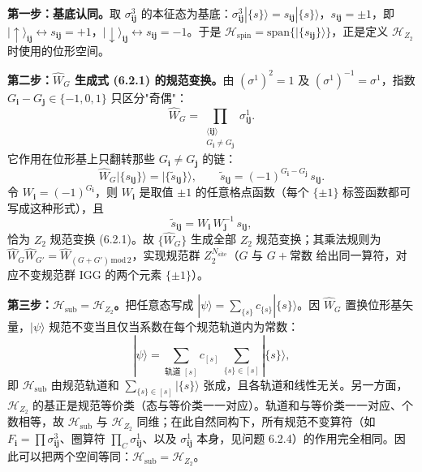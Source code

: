 \textbf{第一步：基底认同。}取 $\sigma^3_{\pmb{ij}}$ 的本征态为基底：$\sigma^3_{\pmb{ij}}|\{s\}\rangle=s_{\pmb{ij}}|\{s\}\rangle$，$s_{\pmb{ij}}=\pm1$，即 $|\uparrow\rangle_{\pmb{ij}}\leftrightarrow s_{\pmb{ij}}=+1$，$|\downarrow\rangle_{\pmb{ij}}\leftrightarrow s_{\pmb{ij}}=-1$。于是 $\mathcal{H}_{\text{spin}}=\text{span}\{|\{s_{\pmb{ij}}\}\rangle\}$，正是定义 $\mathcal{H}_{Z_2}$ 时使用的位形空间。

\textbf{第二步：$\hat W_G$ 生成式 (6.2.1) 的规范变换。}由 $(\sigma^1)^2=1$ 及 $(\sigma^1)^{-1}=\sigma^1$，指数 $G_{\pmb i}-G_{\pmb j}\in\{-1,0,1\}$ 只区分"奇偶"：
\begin{equation*}
\hat W_G=\prod_{\substack{\langle\pmb{ij}\rangle\\ G_{\pmb i}\neq G_{\pmb j}}}\sigma^1_{\pmb{ij}} .
\end{equation*}
它作用在位形基上只翻转那些 $G_{\pmb i}\neq G_{\pmb j}$ 的链：
\begin{equation*}
\hat W_G|\{s_{\pmb{ij}}\}\rangle=\bigl|\{\tilde s_{\pmb{ij}}\}\bigr\rangle,
\qquad
\tilde s_{\pmb{ij}}=(-1)^{G_{\pmb i}-G_{\pmb j}}\,s_{\pmb{ij}} .
\end{equation*}
令 $W_{\pmb i}=(-1)^{G_{\pmb i}}$，则 $W_{\pmb i}$ 是取值 $\pm1$ 的任意格点函数（每个 $\{\pm1\}$ 标签函数都可写成这种形式），且
\begin{equation*}
\tilde s_{\pmb{ij}}=W_{\pmb i}\,W_{\pmb j}^{-1}\,s_{\pmb{ij}},
\end{equation*}
恰为 $Z_2$ 规范变换 (6.2.1)。故 $\{\hat W_G\}$ 生成全部 $Z_2$ 规范变换；其乘法规则为 $\hat W_G\hat W_{G'}=\hat W_{(G+G')\,\mathrm{mod}\,2}$，实现规范群 $Z_2^{N_{\text{site}}}$（$G$ 与 $G+\text{常数}$ 给出同一算符，对应不变规范群 IGG 的两个元素 $\{\pm1\}$）。

\textbf{第三步：$\mathcal{H}_{\text{sub}}=\mathcal{H}_{Z_2}$。}把任意态写成 $|\psi\rangle=\sum_{\{s\}}c_{\{s\}}|\{s\}\rangle$。因 $\hat W_G$ 置换位形基矢量，$|\psi\rangle$ 规范不变当且仅当系数在每个规范轨道内为常数：
\begin{equation*}
|\psi\rangle=\sum_{\text{轨道 }[s]}c_{[s]}\ \sum_{\{s\}\in[s]}|\{s\}\rangle ,
\end{equation*}
即 $\mathcal{H}_{\text{sub}}$ 由规范轨道和 $\sum_{\{s\}\in[s]}|\{s\}\rangle$ 张成，且各轨道和线性无关。另一方面，$\mathcal{H}_{Z_2}$ 的基正是规范等价类（态与等价类一一对应）。轨道和与等价类一一对应、个数相等，故 $\mathcal{H}_{\text{sub}}$ 与 $\mathcal{H}_{Z_2}$ 同维；在此自然同构下，所有规范不变算符（如 $F_{\pmb i}=\prod\sigma^3_{\pmb{ij}}$、圈算符 $\prod_{C}\sigma^1_{\pmb{ij}}$、以及 $\sigma^1_{\pmb{ij}}$ 本身，见问题 6.2.4）的作用完全相同。因此可以把两个空间等同：$\mathcal{H}_{\text{sub}}=\mathcal{H}_{Z_2}$。

